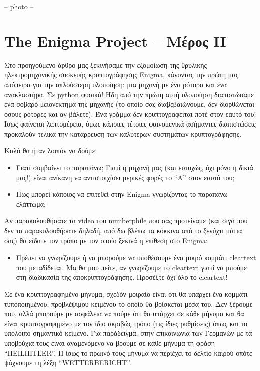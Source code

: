 \documentclass[a4paper,twoside,12pt]{article}
\begin{document}
-- photo --

\section{The Enigma Project -- Mέρος II}

Στο προηγούμενο άρθρο μας ξεκινήσαμε την εξομοίωση της θρυλικής ηλεκτρομηχανικής συσκευής κρυπτογράφησης Enigma, κάνοντας την πρώτη μας απόπειρα για την απλούστερη υλοποίηση: μια μηχανή με ένα ρότορα και ένα ανακλαστήρα. Σε python φυσικά! Ήδη από την πρώτη αυτή υλοποίηση διαπιστώσαμε ένα σοβαρό μειονέκτημα της μηχανής (το οποίο σας διαβεβαιώνουμε, δεν διορθώνεται όσους ρότορες και αν βάλετε): Ένα γράμμα δεν κρυπτογραφείται ποτέ στον εαυτό του! Ίσως φαίνεται  λεπτομέρεια, όμως κάποιες τέτοιες φαινομενικά ασήμαντες διαπιστώσεις προκαλούν τελικά την κατάρρευση των καλύτερων συστημάτων κρυπτογράφησης. 

Καλό θα ήταν λοιπόν να δούμε:

\begin{itemize}
\item Γιατί συμβαίνει το παραπάνω; Γιατί η μηχανή μας (και ευτυχώς, όχι μόνο η δικιά μας!) είναι ανίκανη να αντιστοιχίσει μερικές φορές το “Α” στον εαυτό του;
\item Πως μπορεί κάποιος να επιτεθεί στην Enigma γνωρίζοντας το παραπάνω ελάττωμα;
\end{itemize}

Αν παρακολουθήσατε τα video του numberphile που σας προτείναμε (και σιγά που δεν τα παρακολουθήσατε δηλαδή, από δω βλέπω τα κόκκινα από το ξενύχτι  μάτια σας) θα είδατε τον τρόπο με τον οποίο ξεκινά η επίθεση στο Enigma:

\begin{itemize}
\item Πρέπει να γνωρίζουμε ή να μπορούμε να υποθέσουμε ένα μικρό κομμάτι cleartext που μεταδίδεται. Μα θα μου πείτε, αν γνωρίζουμε το cleartext γιατί να μπούμε στη διαδικασία της αποκρυπτογράφησης. Προσέξτε όχι όλο το cleartext!
\end{itemize}

Σε ένα κρυπτογραφημένο μήνυμα, σχεδόν μοιραίο είναι ότι θα υπάρχει ένα κομμάτι τυποποιημένου, προβλέψιμου κειμένου το οποίο θα βρίσκεται μέσα του. Δεν ξέρουμε που, αλλά μπορούμε με ασφάλεια να πούμε ότι θα υπάρχει σε κάθε μήνυμα και θα είναι κρυπτογραφημένο με τον ίδιο ακριβώς τρόπο (τις ίδιες ρυθμίσεις) όπως και το υπόλοιπο σημαντικό κείμενο. Για παράδειγμα, στην επικοινωνία των Γερμανών με τα υποβρύχια τους είναι αναμενόμενο να βρούμε σε κάθε μήνυμα τη φράση “HEILHITLER”. Ή ίσως το πρωινό τους μήνυμα να περιέχει το δελτίο καιρού οπότε ψάχνουμε τη λέξη “WETTERBERICHT”.
\end{document}
